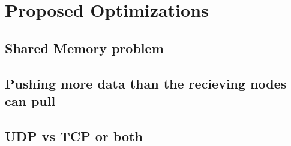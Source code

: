 \section{Proposed Optimizations}
\label{sec:optimizations}

\subsection{Shared Memory problem}

\subsection{Pushing more data than the recieving nodes can pull}

\subsection{UDP vs TCP or both}






